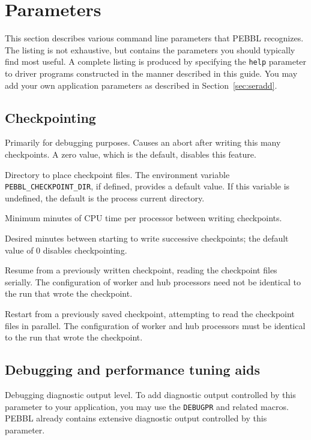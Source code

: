 \section{Parameters}
\label{sec:param}
This section describes various command line parameters that PEBBL
recognizes.  The listing is not exhaustive, but contains the
parameters you should typically find most useful.  A complete listing
is produced by specifying the \texttt{help} parameter to driver
programs constructed in the manner described in this guide.  You may
add your own application parameters as described in Section~\ref{sec:seradd}.


\subsection{Checkpointing}
\vspace{-3ex}
 Primarily for
debugging purposes. Causes an abort after writing this many
checkpoints.  A zero value, which is the default, disables this feature.

 Directory to place checkpoint files.  The environment
variable \texttt{PEBBL\_CHECKPOINT\_DIR}, if defined, provides a
default value.  If this variable is undefined, the default is the process
current directory.

Minimum minutes of CPU time per processor between writing
checkpoints.  

Desired minutes between starting to write successive checkpoints; the default
value of $0$ disables checkpointing.

Resume from a previously written checkpoint, reading the checkpoint
files serially.  The configuration of worker and hub processors need
not be identical to the run that wrote the checkpoint.

 Restart from a previously saved
checkpoint, attempting to read the checkpoint files in parallel.  The
configuration of worker and hub processors must be identical to
the run that wrote the checkpoint.

\subsection{Debugging and performance tuning aids}
\label{sec:debugparams}
\vspace{-3ex}
Debugging diagnostic output level.  To add diagnostic output controlled by
this parameter to your application, you may use the \texttt{DEBUGPR} and
related macros.  PEBBL already contains extensive diagnostic output controlled
by this parameter.

